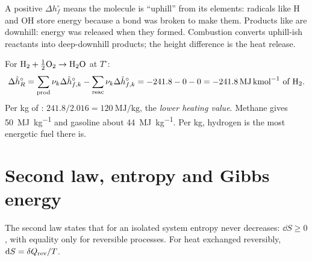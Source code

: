 \begin{intuition}
A positive $\Delta h_f^\circ$ means the molecule is ``uphill'' from its elements: radicals like H
and OH store energy because a bond was broken to make them. Products like  are downhill:
energy was released when they formed. Combustion converts uphill-ish reactants into
deep-downhill products; the height difference is the heat release.
\end{intuition}

\begin{example}
For $\mathrm{H_2}+\tfrac12\mathrm{O_2}\to\mathrm{H_2O}$ at $T^\circ$:
\[
\Delta\hat h_R^\circ=\sum_\text{prod}\nu_k\Delta \hat h_{f,k}^\circ-\sum_\text{reac}\nu_k\Delta \hat h_{f,k}^\circ
=-241.8-0-0=\SI{-241.8}{\mega\joule\per\kilo\mole}\ \text{of \ensuremath{\mathrm{H_2}}}.
\]
Per kg of : $241.8/2.016=\SI{120}{\mega\joule\per\kilo\gram}$, the \emph{lower heating
value}. Methane gives \SI{50}{\mega\joule\per\kilo\gram} and gasoline about
\SI{44}{\mega\joule\per\kilo\gram}. Per kg, hydrogen is the most energetic fuel there is.
\end{example}

\section{Second law, entropy and Gibbs energy}
\label{sec:entropy}

The second law states that for an isolated system entropy never decreases: $\dd S\ge 0$, with
equality only for reversible processes. For heat exchanged reversibly, $\mathrm{d} S=\delta Q_{\rm rev}/T$.

